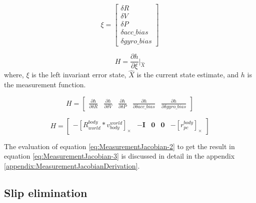 \documentclass[report.tex]{subfiles}
\begin{document}
        
        \begin{equation}
            \xi = \begin{bmatrix}
            \delta R \\
            \delta V \\
            \delta P \\
            \delta acc\_bias \\
            \delta gyro\_bias
            \end{bmatrix}
            \label{eq:ErrorStateVector}
        \end{equation}
        
        \begin{equation}
            H = \frac{\partial h}{\partial \xi}\bigg|_{\hat{X}}
            \label{eq:MeasurementJacobian-1}
        \end{equation}
        where, $\xi$ is the left invariant error state, $\hat{X}$ is the current state estimate, and $h$ is the measurement function. 
        
        
        \begin{equation}
            H = \begin{bmatrix}
            \frac{\partial h}{\partial \delta R} & \frac{\partial h}{\partial \delta V} & \frac{\partial h}{\partial \delta P} & \frac{\partial h}{\partial \delta acc\_bias} & \frac{\partial h}{\partial \delta gyro\_bias}
            \end{bmatrix}
            \label{eq:MeasurementJacobian-2}
        \end{equation}
        
        \begin{equation}
            H = \begin{bmatrix}
                -[R_{world}^{body} * v_{body}^{world}]_\times & -\mathbf{I} & \mathbf{0} & \mathbf{0} & -[r_{pc}^{body}]_\times
            \end{bmatrix}
            \label{eq:MeasurementJacobian-3}      
        \end{equation}
       
        The evaluation of equation \ref{eq:MeasurementJacobian-2} to get the result in equation \ref{eq:MeasurementJacobian-3} is discussed in detail in the appendix \ref{appendix:MeasurementJacobianDerivation}.

    \subsection{Slip elimination}
    
    


    
\end{document}
